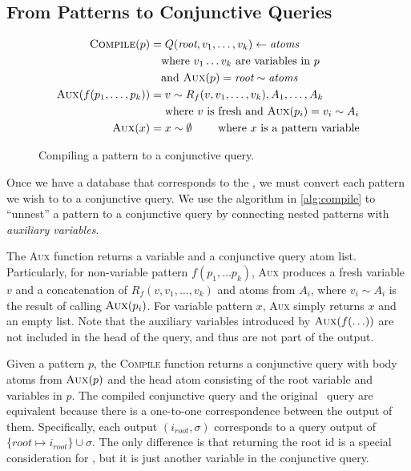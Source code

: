 \subsection{From Patterns to Conjunctive Queries}
\label{sec:pattern-to-query}

\def\aux{\textsc{Aux}} \def\compile{\textsc{Compile}}
\begin{figure}
  \begin{align*}
    \compile(p) &= Q(\textit{root}, v_1,\ldots,v_k) \leftarrow \textit{atoms}\\
                &\text{\quad where $v_1\dots v_k$ are variables in $p$}\\
                &\text{\quad and $\aux(p) = \textit{root} \sim \textit{atoms}$}
    \\
    \aux(f(p_1,\ldots, p_k)) &= v \sim R_f(v, v_1, \ldots, v_k), A_1, \ldots, A_k \\
                & \text{\quad { where} $v$ is fresh and }\aux(p_i) = v_i \sim A_i
    \\
    \aux(x) &= x \sim \emptyset \text{\qquad { where} $x$ is a pattern variable}\\
  \end{align*}
  \caption{Compiling a pattern to a conjunctive query.}\label{alg:compile}
\end{figure}



Once we have a database that corresponds to the \egraph,
 we must convert each pattern we wish to \ematch to a conjunctive query.
We use the algorithm in
\autoref{alg:compile} to ``unnest'' a pattern to a conjunctive query
 by connecting nested patterns with \textit{auxiliary variables}.

The \aux{}
function returns a variable and a conjunctive query atom list.
Particularly, for
non-variable pattern $f(p_1,\ldots p_k)$,
\aux{} produces a fresh variable $v$
and a concatenation of $R_f(v, v_1,\ldots, v_k)$ and atoms from $A_i$, where
$v_i\sim A_i$ is the result of calling $\aux(p_i)$.
For variable pattern $x$,
 \aux{} simply returns $x$ and an empty list.
Note that the auxiliary variables introduced by
 $\aux(f(\ldots))$ are not included in the head of the query,
 and thus are not part of the output.

Given a pattern $p$, the \compile{}
function returns a conjunctive query with body atoms from $\aux(p)$ and the head
atom consisting of the root variable and variables in $p$. The compiled
conjunctive query and the original \ematching~query are equivalent because there
is a one-to-one correspondence between the output of them.
Specifically, each
 \ematching output
 $(i_{\textit{root}}, \sigma)$
 corresponds to a query output of
 $\{ \textit{root} \mapsto i_{\textit{root}} \} \cup \sigma$.
The only difference is that
 returning the root \eclass id is a special consideration for \ematching,
 but it is just another variable in the conjunctive query.

